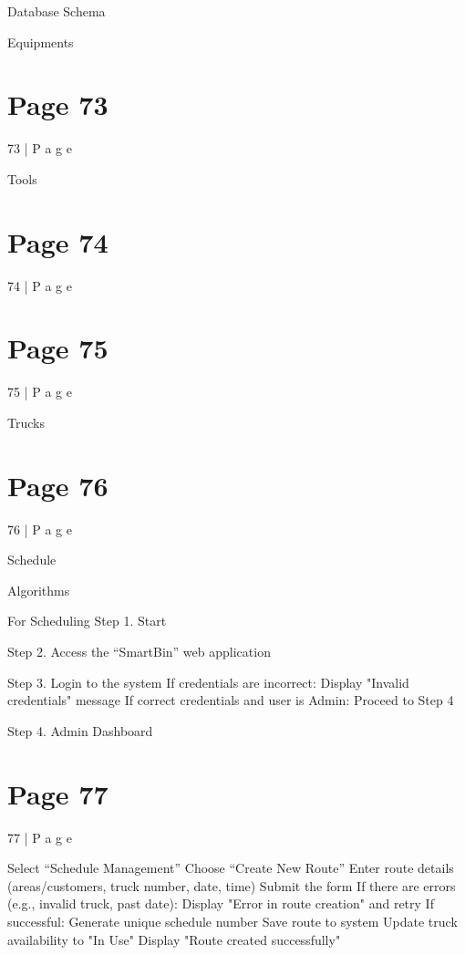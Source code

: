 \documentclass{article}
\begin{document}
Database Schema 
 
Equipments  

\section*{Page 73}
73 | P a g e 
 
 
 
 
 
 
 
 
Tools 
 


\section*{Page 74}
74 | P a g e 
 
 
 
 
 
 
 
 
 
 
 
 
 


\section*{Page 75}
75 | P a g e 
 
Trucks 
 
 
 
 
 
 
 


\section*{Page 76}
76 | P a g e 
 
Schedule 
 
 
Algorithms 
 
For Scheduling 
Step 1. Start 
  
Step 2. Access the “SmartBin” web application 
  
Step 3. Login to the system 
    If credentials are incorrect: Display "Invalid credentials" message 
    If correct credentials and user is Admin: Proceed to Step 4 
  
Step 4. Admin Dashboard 


\section*{Page 77}
77 | P a g e 
 
    Select “Schedule Management” 
    Choose “Create New Route” 
    Enter route details (areas/customers, truck number, date, time) 
    Submit the form 
    If there are errors (e.g., invalid truck, past date): Display "Error in route creation" and retry 
    If successful: 
        Generate unique schedule number 
        Save route to system 
        Update truck availability to "In Use" 
        Display "Route created successfully" 
  
\end{document}
